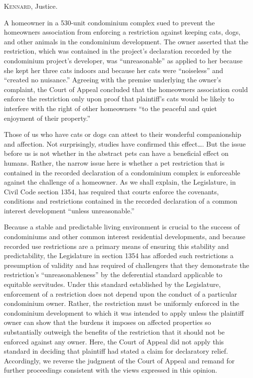 

\opinion \textsc{Kennard}, Justice.

A homeowner in a 530-unit condominium complex sued to prevent the homeowners
association from enforcing a restriction against keeping cats, dogs, and other
animals in the condominium development. The owner asserted that the restriction,
which was contained in the project's declaration recorded by the condominium
project's developer, was ``unreasonable'' as applied to her because she kept her
three cats indoors and because her cats were ``noiseless'' and ``created no
nuisance.'' Agreeing with the premise underlying the owner's complaint, the
Court of Appeal concluded that the homeowners association could enforce the
restriction only upon proof that plaintiff's cats would be likely to interfere
with the right of other homeowners ``to the peaceful and quiet enjoyment of
their property.''

Those of us who have cats or dogs can attest to their wonderful companionship
and affection. Not surprisingly, studies have confirmed this effect\ldots . But
the issue before us is not whether in the abstract pets can have a beneficial
effect on humans. Rather, the narrow issue here is whether a pet restriction
that is contained in the recorded declaration of a condominium complex is
enforceable against the challenge of a homeowner. As we shall explain, the
Legislature, in Civil Code section 1354, has required that courts enforce the
covenants, conditions and restrictions contained in the recorded declaration of
a common interest development ``unless unreasonable.''

Because a stable and predictable living environment is crucial to the success of
condominiums and other common interest residential developments, and because
recorded use restrictions are a primary means of ensuring this stability and
predictability, the Legislature in section 1354 has afforded such restrictions a
presumption of validity and has required of challengers that they demonstrate
the restriction's ``unreasonableness'' by the deferential standard applicable to
equitable servitudes. Under this standard established by the Legislature,
enforcement of a restriction does not depend upon the conduct of a particular
condominium owner. Rather, the restriction must be uniformly enforced in the
condominium development to which it was intended to apply unless the plaintiff
owner can show that the burdens it imposes on affected properties so
substantially outweigh the benefits of the restriction that it should not be
enforced against any owner. Here, the Court of Appeal did not apply this
standard in deciding that plaintiff had stated a claim for declaratory relief.
Accordingly, we reverse the judgment of the Court of Appeal and remand for
further proceedings consistent with the views expressed in this opinion.

